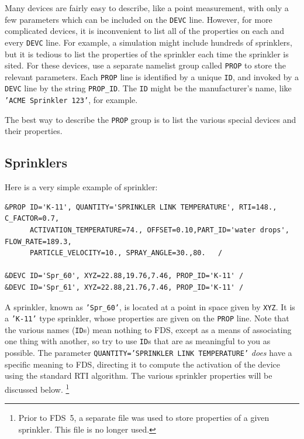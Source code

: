 \documentclass[11pt]{book}
\newcommand{\ct}{\tt\small}
\begin{document}
Many devices are fairly easy to describe, like a point measurement, with only a few parameters which can be included on the
{\ct DEVC} line. However, for more complicated devices, it is inconvenient to list all of the properties on each and every
{\ct DEVC} line. For example, a simulation might include hundreds of sprinklers, but it is tedious to list the properties of the
sprinkler each time the sprinkler is sited. For these devices, use a separate namelist group called {\ct PROP} to store the relevant parameters.
Each {\ct PROP} line is identified by a unique {\ct ID}, and invoked by a {\ct DEVC} line by the string {\ct PROP\_ID}.
The {\ct ID} might be the manufacturer's
name, like {\ct 'ACME Sprinkler 123'}, for example.

The best way to describe the {\ct PROP} group is to list the various special devices and their properties.


\subsection{Sprinklers}
\label{info:sprinklers}

Here is a very simple example of sprinkler:

\footnotesize
\begin{verbatim}
&PROP ID='K-11', QUANTITY='SPRINKLER LINK TEMPERATURE', RTI=148., C_FACTOR=0.7,
      ACTIVATION_TEMPERATURE=74., OFFSET=0.10,PART_ID='water drops', FLOW_RATE=189.3,
      PARTICLE_VELOCITY=10., SPRAY_ANGLE=30.,80.   /

&DEVC ID='Spr_60', XYZ=22.88,19.76,7.46, PROP_ID='K-11' /
&DEVC ID='Spr_61', XYZ=22.88,21.76,7.46, PROP_ID='K-11' /
\end{verbatim} \normalsize

\noindent
A sprinkler, known as {\ct 'Spr\_60'}, is located at a point in space given by {\ct XYZ}. It is a {\ct 'K-11'} type sprinkler, whose properties
are given on the {\ct PROP} line. Note that the various names ({\ct ID}s) mean nothing to FDS, except as a means of associating one thing with
another, so try to use {\ct ID}s that are as meaningful to you as possible.  The parameter {\ct QUANTITY='SPRINKLER LINK TEMPERATURE'} {\em does}
have a specific meaning to FDS, directing it to compute the activation of
the device using the standard RTI algorithm. The various sprinkler properties will be discussed below.
\footnote{Prior to FDS~5, a separate file was used to store
properties of a given sprinkler. This file is no longer used.}
\end{document}
